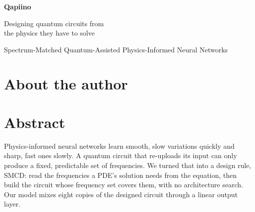 \documentclass[11pt,a4paper]{article}
\newcommand{\newpart}{\clearpage}
\begin{document}
\begin{titlepage}
  \centering
  \vspace*{1.5cm}
  \CoverLogos
  \vspace{1.8cm}

  {\Huge\bfseries Qapiino\par}
  \vspace{0.4cm}
  {\LARGE Designing quantum circuits from\\the physics they have to solve\par}
  \vspace{0.6cm}
  {\large Spectrum-Matched Quantum-Assisted Physics-Informed Neural Networks\par}
  \vspace{1.5cm}


  \vfill
  {\large \CoverProgram\par}
  \vspace{0.3cm}
  {\large \CoverAuthor\par}
  \vspace{0.3cm}
  {\color{muted} \CoverDate\par}
\end{titlepage}

\section*{About the author}
\TeamPage


\newpart
\section*{Abstract}
Physics-informed neural networks learn smooth, slow variations quickly and sharp, fast
ones slowly. A quantum circuit that re-uploads its input can only produce a fixed,
predictable set of frequencies. We turned that into a design rule, SMCD: read the
frequencies a PDE's solution needs from the equation, then build the circuit whose
frequency set covers them, with no architecture search. Our model mixes eight copies of
the designed circuit through a linear output layer.
\end{document}
